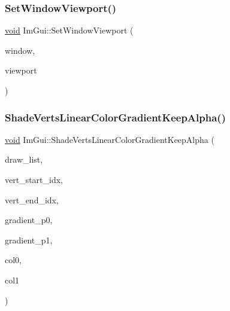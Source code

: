 \mbox{\label{namespaceImGui_ada7b6ffaa06eb1ef3422766fecce6866}} 
\subsubsection{\texorpdfstring{Set\+Window\+Viewport()}{SetWindowViewport()}}
{\footnotesize\ttfamily \hyperlink{imgui__impl__opengl3__loader_8h_ac668e7cffd9e2e9cfee428b9b2f34fa7}{void} Im\+Gui\+::\+Set\+Window\+Viewport (\begin{DoxyParamCaption}\item[{\hyperlink{structImGuiWindow}{Im\+Gui\+Window} $\ast$}]{window,  }\item[{\hyperlink{structImGuiViewportP}{Im\+Gui\+ViewportP} $\ast$}]{viewport }\end{DoxyParamCaption})}

\mbox{\label{namespaceImGui_acd137f6ee31f657e539eaa7e62f4f28a}} 
\subsubsection{\texorpdfstring{Shade\+Verts\+Linear\+Color\+Gradient\+Keep\+Alpha()}{ShadeVertsLinearColorGradientKeepAlpha()}}
{\footnotesize\ttfamily \hyperlink{imgui__impl__opengl3__loader_8h_ac668e7cffd9e2e9cfee428b9b2f34fa7}{void} Im\+Gui\+::\+Shade\+Verts\+Linear\+Color\+Gradient\+Keep\+Alpha (\begin{DoxyParamCaption}\item[{\hyperlink{structImDrawList}{Im\+Draw\+List} $\ast$}]{draw\+\_\+list,  }\item[{int}]{vert\+\_\+start\+\_\+idx,  }\item[{int}]{vert\+\_\+end\+\_\+idx,  }\item[{\hyperlink{structImVec2}{Im\+Vec2}}]{gradient\+\_\+p0,  }\item[{\hyperlink{structImVec2}{Im\+Vec2}}]{gradient\+\_\+p1,  }\item[{Im\+U32}]{col0,  }\item[{Im\+U32}]{col1 }\end{DoxyParamCaption})}

